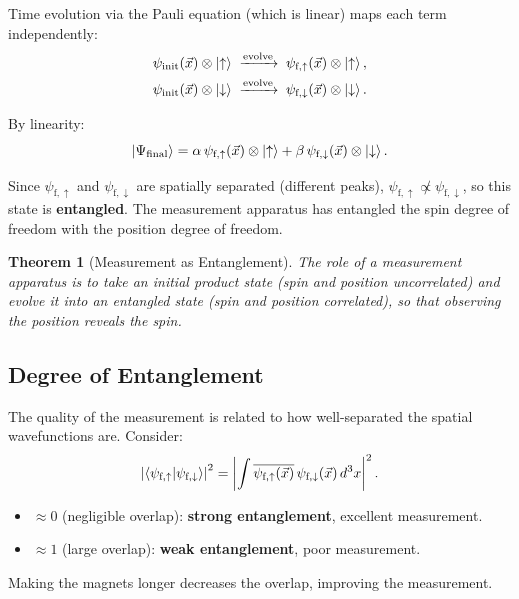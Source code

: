 \documentclass[11pt,a4paper]{article}
\theoremstyle{definition}
\theoremstyle{plain}
\newtheorem{theorem}{Theorem}[section]
\theoremstyle{remark}
\begin{document}
Time evolution via the Pauli equation (which is linear) maps each term independently:
\begin{align}
    \psi_{\text{init}}(\vec{x})\otimes\ket{\uparrow} &\;\xrightarrow{\text{evolve}}\; \psi_{\text{f},\uparrow}(\vec{x})\otimes\ket{\uparrow}, \\
    \psi_{\text{init}}(\vec{x})\otimes\ket{\downarrow} &\;\xrightarrow{\text{evolve}}\; \psi_{\text{f},\downarrow}(\vec{x})\otimes\ket{\downarrow}.
\end{align}

By linearity:
\[
    \ket{\Psi_{\text{final}}} = \alpha\,\psi_{\text{f},\uparrow}(\vec{x})\otimes\ket{\uparrow} + \beta\,\psi_{\text{f},\downarrow}(\vec{x})\otimes\ket{\downarrow}.
\]

Since $\psi_{\text{f},\uparrow}$ and $\psi_{\text{f},\downarrow}$ are spatially separated (different peaks), $\psi_{\text{f},\uparrow} \not\propto \psi_{\text{f},\downarrow}$, so this state is \textbf{entangled}. The measurement apparatus has entangled the spin degree of freedom with the position degree of freedom.

\begin{theorem}[Measurement as Entanglement]
    The role of a measurement apparatus is to take an initial product state (spin and position uncorrelated) and evolve it into an entangled state (spin and position correlated), so that observing the position reveals the spin.
\end{theorem}

\subsection{Degree of Entanglement}

The quality of the measurement is related to how well-separated the spatial wavefunctions are. Consider:
\[
    \left|\braket{\psi_{\text{f},\uparrow}}{\psi_{\text{f},\downarrow}}\right|^2 = \left|\int \overline{\psi_{\text{f},\uparrow}(\vec{x})}\,\psi_{\text{f},\downarrow}(\vec{x})\,d^3x\right|^2.
\]

\begin{itemize}
    \item $\approx 0$ (negligible overlap): \textbf{strong entanglement}, excellent measurement.
    \item $\approx 1$ (large overlap): \textbf{weak entanglement}, poor measurement.
\end{itemize}

Making the magnets longer decreases the overlap, improving the measurement.
\end{document}
